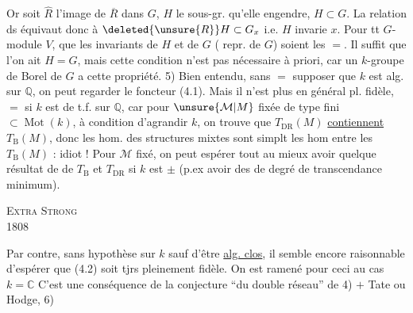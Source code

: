 Or soit $\widehat R$ l'image de $\overline R$ dans $G$, $H$ le sous-gr. qu'elle engendre, $H\subset G$.  La relation ds équivaut donc à $\deleted{\unsure{R}}H\subset G_x$ i.e. $H$ invarie $x$.
Pour tt $G$-module $V$, 
 que les invariants de $H$ et de $G$ (  repr. de $G$) soient les $=$. Il suffit que l'on ait $H=G$, mais cette condition n'est pas nécessaire à priori, car un $k$-groupe de Borel de $G$ a cette propriété.
5) Bien entendu, sans $=$ supposer que $k$ est alg. sur $\mathbb Q$, on peut regarder le foncteur (4.1). Mais il n'est plus en général pl. fidèle, $=$ si $k$ est de t.f. sur $\mathbb Q$, car pour $\unsure{\mathcal M|M}$  fixée de type fini $\subset\operatorname{Mot}(k)$, à condition d'agrandir $k$, on trouve que  $T_{\mathrm{DR}}(M)$ \uline{contiennent} $T_{\mathrm B}(M)$, donc les hom. des structures mixtes sont simplt les hom entre les $T_{\mathrm B}(M)$ : idiot !
Pour $\mathcal M$ fixé, on peut espérer tout au mieux avoir quelque résultat de  de $T_{\mathrm B}$ et $T_{\mathrm{DR}}$ si $k$ est $\pm$  (p.ex avoir des  de degré de transcendance minimum).
\par\noindent\textsc{Extra Strong}\\
 1808

Par contre, sans hypothèse sur $k$ sauf d'être \uline{alg. clos}, il semble encore raisonnable d'espérer que (4.2) soit tjrs pleinement fidèle.
On est ramené pour ceci au cas $k=\mathbb C$ C'est une conséquence de la conjecture ``du double réseau'' de 4) $+$ Tate ou Hodge,   6)

